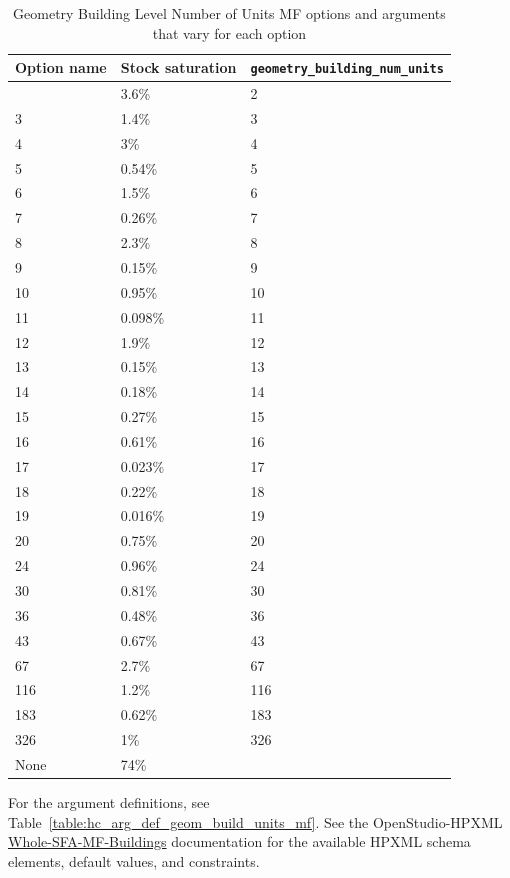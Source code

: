 \begin{longtable}[]{ |p{}|p{4cm}|p{4cm}| }
\caption{Geometry Building Level Number of Units MF options and arguments that vary for each option} \label{table:hc_opt_geom_build_units_mf}  \\
\toprule\noalign{}
Option name & Stock saturation &
\texttt{geometry\_building\_num\_units} \\
\midrule\noalign{}
\endhead
\bottomrule\noalign{}
\endlastfoot
2 & 3.6\% & 2 \\ \hline
3 & 1.4\% & 3 \\ \hline
4 & 3\% & 4 \\ \hline
5 & 0.54\% & 5 \\ \hline
6 & 1.5\% & 6 \\ \hline
7 & 0.26\% & 7 \\ \hline
8 & 2.3\% & 8 \\ \hline
9 & 0.15\% & 9 \\ \hline
10 & 0.95\% & 10 \\ \hline
11 & 0.098\% & 11 \\ \hline
12 & 1.9\% & 12 \\ \hline
13 & 0.15\% & 13 \\ \hline
14 & 0.18\% & 14 \\ \hline
15 & 0.27\% & 15 \\ \hline
16 & 0.61\% & 16 \\ \hline
17 & 0.023\% & 17 \\ \hline
18 & 0.22\% & 18 \\ \hline
19 & 0.016\% & 19 \\ \hline
20 & 0.75\% & 20 \\ \hline
24 & 0.96\% & 24 \\ \hline
30 & 0.81\% & 30 \\ \hline
36 & 0.48\% & 36 \\ \hline
43 & 0.67\% & 43 \\ \hline
67 & 2.7\% & 67 \\ \hline
116 & 1.2\% & 116 \\ \hline
183 & 0.62\% & 183 \\ \hline
326 & 1\% & 326 \\ \hline
None & 74\% & \\ 
\end{longtable}

For the argument definitions, see Table~\ref{table:hc_arg_def_geom_build_units_mf}. See the OpenStudio-HPXML \href{https://openstudio-hpxml.readthedocs.io/en/v1.8.1/workflow_inputs.html#whole-sfa-mf-buildings}{Whole-SFA-MF-Buildings} documentation for the available HPXML schema elements, default values, and constraints.

